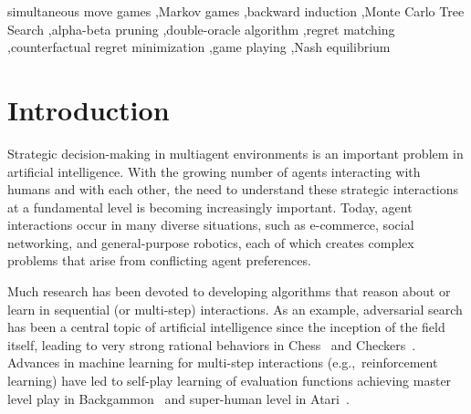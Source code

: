 \documentclass[preprint,12pt]{elsarticle}
\newcommand{\eg}{{e.g.,}~}
\newcounter{mlNoteCounter}
\newcounter{bbNoteCounter}
\newcommand{\mlanctot}[1]{{\small \color{darkgreen} $\blacksquare$ \refstepcounter{mlNoteCounter}\textsf{[ML]$_{\arabic{mlNoteCounter}}$:{#1}}}}
\newcommand{\bbosansky}[1]{{\small \color{orange} $\blacktriangle$ \refstepcounter{bbNoteCounter}\textsf{[BB]$_{\arabic{bbNoteCounter}}$:{#1}}}}
\begin{document}
\begin{frontmatter}
\begin{keyword}
simultaneous move games \sep Markov games \sep backward induction \sep Monte Carlo Tree Search \sep alpha-beta pruning \sep double-oracle algorithm \sep regret matching \sep counterfactual regret minimization \sep game playing \sep Nash equilibrium

\end{keyword}

\end{frontmatter}





\section{Introduction}
\label{sec:intro}

Strategic decision-making in multiagent environments is an important problem in artificial intelligence.
With the growing number of agents interacting with humans and with each other, the need to
understand these strategic interactions at a fundamental level is becoming increasingly important.
Today, agent interactions occur in many diverse situations, such as e-commerce, social networking, and
general-purpose robotics, each of which creates complex problems that arise from conflicting agent
preferences.

Much research has been devoted to developing algorithms that reason about or learn in sequential (or multi-step)
interactions. As an example, adversarial search has been a central topic of artificial intelligence
since the inception of the field itself, leading to very strong rational behaviors in
Chess~\cite{Campbell02deepblue} and Checkers~\cite{Schaeffer96chinook}. Advances in machine learning for multi-step interactions
(\eg reinforcement learning) have led to self-play learning of evaluation functions achieving master level play
in Backgammon~\cite{Tesauro95TDGammon} and super-human level in Atari~\cite{mnih-dqn-2015}.
\end{document}
